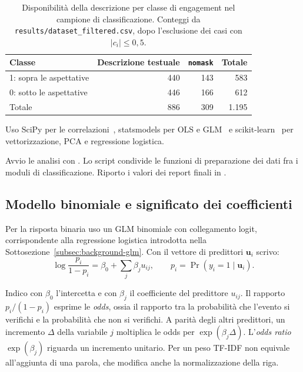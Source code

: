 \begin{table}[htbp]
    \centering\small
    \caption{Disponibilità della descrizione per classe di engagement nel campione di classificazione. Conteggi da \texttt{results/dataset\_filtered.csv}, dopo l'esclusione dei casi con $|c_i|\leq0{,}5$.}
    \label{tab:associazione-campione}
    \begin{tabular}{@{}lrrr@{}}
        \toprule
        Classe & Descrizione testuale & \texttt{nomask} & Totale \\
        \midrule
        1: sopra le aspettative & 440 & 143 & 583 \\
        0: sotto le aspettative & 446 & 166 & 612 \\
        \midrule
        Totale & 886 & 309 & 1.195 \\
        \bottomrule
    \end{tabular}
\end{table}

Uso SciPy per le correlazioni~\cite{2020SciPy-NMeth}, statsmodels per OLS e GLM~\cite{josef_perktold_2024_10984387} e scikit-learn~\cite{scikit-learn} per vettorizzazione, PCA e regressione logistica.

Avvio le analisi con . Lo script condivide le funzioni di preparazione dei dati fra i moduli di classificazione. Riporto i valori dei report finali in .

\subsection{Modello binomiale e significato dei coefficienti}
\label{subsec:associazione-glm}

Per la risposta binaria uso un GLM binomiale con collegamento logit, corrispondente alla regressione logistica introdotta nella Sottosezione~\ref{subsec:background-glm}. Con il vettore di predittori $\mathbf{u}_i$ scrivo:
\begin{equation}
    \log\frac{p_i}{1-p_i}=\beta_0+\sum_j\beta_j u_{ij},
    \qquad p_i=\Pr(y_i=1\mid\mathbf{u}_i).
    \label{eq:classificazione-logit}
\end{equation}

Indico con $\beta_0$ l'intercetta e con $\beta_j$ il coefficiente del predittore $u_{ij}$. Il rapporto $p_i/(1-p_i)$ esprime le \emph{odds}, ossia il rapporto tra la probabilità che l'evento si verifichi e la probabilità che non si verifichi. A parità degli altri predittori, un incremento $\Delta$ della variabile $j$ moltiplica le odds per $\exp(\beta_j\Delta)$. L'\emph{odds ratio} $\exp(\beta_j)$ riguarda un incremento unitario. Per un peso TF-IDF non equivale all'aggiunta di una parola, che modifica anche la normalizzazione della riga.

